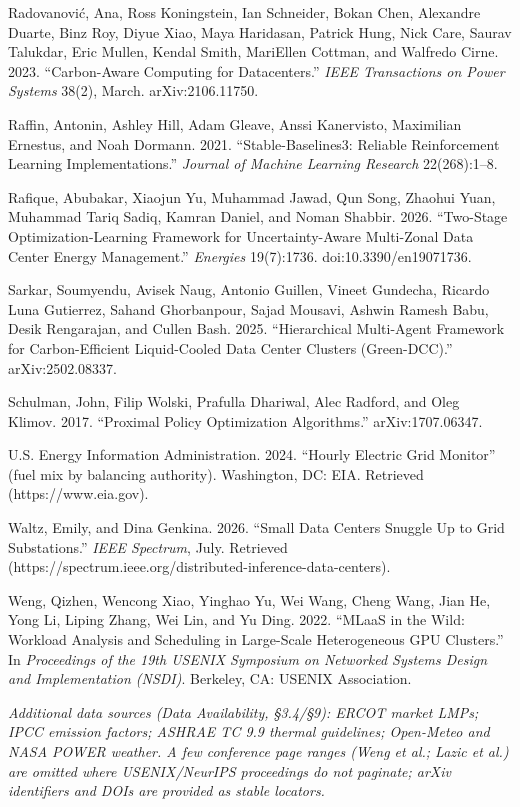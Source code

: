 \documentclass[
  11pt,
]{article}
\begin{document}
Radovanović, Ana, Ross Koningstein, Ian Schneider, Bokan Chen, Alexandre
Duarte, Binz Roy, Diyue Xiao, Maya Haridasan, Patrick Hung, Nick Care,
Saurav Talukdar, Eric Mullen, Kendal Smith, MariEllen Cottman, and
Walfredo Cirne. 2023. ``Carbon-Aware Computing for Datacenters.''
\emph{IEEE Transactions on Power Systems} 38(2), March.
arXiv:2106.11750.

Raffin, Antonin, Ashley Hill, Adam Gleave, Anssi Kanervisto, Maximilian
Ernestus, and Noah Dormann. 2021. ``Stable-Baselines3: Reliable
Reinforcement Learning Implementations.'' \emph{Journal of Machine
Learning Research} 22(268):1--8.

Rafique, Abubakar, Xiaojun Yu, Muhammad Jawad, Qun Song, Zhaohui Yuan,
Muhammad Tariq Sadiq, Kamran Daniel, and Noman Shabbir. 2026.
``Two-Stage Optimization-Learning Framework for Uncertainty-Aware
Multi-Zonal Data Center Energy Management.'' \emph{Energies} 19(7):1736.
doi:10.3390/en19071736.

Sarkar, Soumyendu, Avisek Naug, Antonio Guillen, Vineet Gundecha,
Ricardo Luna Gutierrez, Sahand Ghorbanpour, Sajad Mousavi, Ashwin Ramesh
Babu, Desik Rengarajan, and Cullen Bash. 2025. ``Hierarchical
Multi-Agent Framework for Carbon-Efficient Liquid-Cooled Data Center
Clusters (Green-DCC).'' arXiv:2502.08337.

Schulman, John, Filip Wolski, Prafulla Dhariwal, Alec Radford, and Oleg
Klimov. 2017. ``Proximal Policy Optimization Algorithms.''
arXiv:1707.06347.

U.S. Energy Information Administration. 2024. ``Hourly Electric Grid
Monitor'' (fuel mix by balancing authority). Washington, DC: EIA.
Retrieved (https://www.eia.gov).

Waltz, Emily, and Dina Genkina. 2026. ``Small Data Centers Snuggle Up to
Grid Substations.'' \emph{IEEE Spectrum}, July. Retrieved
(https://spectrum.ieee.org/distributed-inference-data-centers).

Weng, Qizhen, Wencong Xiao, Yinghao Yu, Wei Wang, Cheng Wang, Jian He,
Yong Li, Liping Zhang, Wei Lin, and Yu Ding. 2022. ``MLaaS in the Wild:
Workload Analysis and Scheduling in Large-Scale Heterogeneous GPU
Clusters.'' In \emph{Proceedings of the 19th USENIX Symposium on
Networked Systems Design and Implementation (NSDI)}. Berkeley, CA:
USENIX Association.

\emph{Additional data sources (Data Availability, §3.4/§9): ERCOT market
LMPs; IPCC emission factors; ASHRAE TC 9.9 thermal guidelines;
Open-Meteo and NASA POWER weather. A few conference page ranges (Weng et
al.; Lazic et al.) are omitted where USENIX/NeurIPS proceedings do not
paginate; arXiv identifiers and DOIs are provided as stable locators.}
\end{document}
